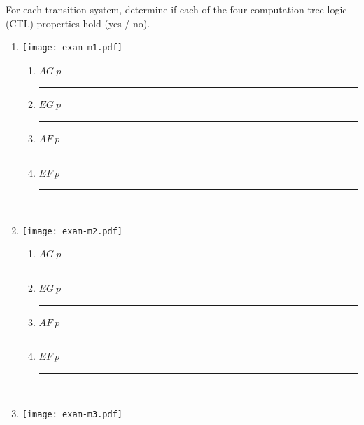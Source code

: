 \documentclass[12pt]{article}
\newenvironment{problem}[2][Problem]{\begin{trivlist}
\item[\hskip \labelsep {\bfseries #1}\hskip \labelsep {\bfseries #2.}]}{\end{trivlist}}
\begin{document}
\begin{problem}{CTL Properties. 16 points total (1 point each)} For each transition system, determine if each of the four computation tree logic (CTL) properties hold (yes / no).

\begin{enumerate}[label=\Alph*.]

\item  

\hspace{4cm}\texttt{[image: exam-m1.pdf]}

\begin{multicols}{4}
\begin{enumerate}[label=\roman*.]

\item $AG \ p$ \ \ \rule{1.4cm}{0.15mm}
\item $EG \ p$ \ \ \rule{1.4cm}{0.15mm}
\item $AF \ p$ \ \ \rule{1.4cm}{0.15mm}
\item $EF \ p$ \ \ \rule{1.4cm}{0.15mm}

\end{enumerate}
\end{multicols}


~\\

\item 

\hspace{4cm}\texttt{[image: exam-m2.pdf]}

\begin{multicols}{4}
\begin{enumerate}[label=\roman*.]

\item $AG \ p$ \ \ \rule{1.4cm}{0.15mm}
\item $EG \ p$ \ \ \rule{1.4cm}{0.15mm}
\item $AF \ p$ \ \ \rule{1.4cm}{0.15mm}
\item $EF \ p$ \ \ \rule{1.4cm}{0.15mm}

\end{enumerate}
\end{multicols}


~\\

\item 

\hspace{4cm}\texttt{[image: exam-m3.pdf]}

\begin{multicols}{4}
\begin{enumerate}[label=\roman*.]


\end{enumerate}
\end{multicols}
\end{enumerate}
\end{problem}
\end{document}
